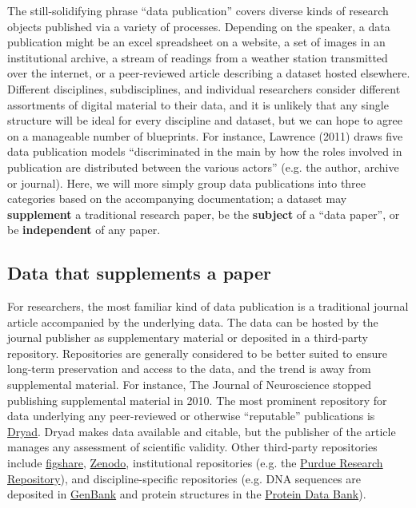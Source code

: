 \documentclass[10pt,twocolumn]{article}
\begin{document}
The still-solidifying phrase ``data publication'' covers diverse kinds of research objects published via a variety of processes.
Depending on the speaker, a data publication might be an excel spreadsheet on a website, a set of images in an institutional archive, a stream of readings from a weather station transmitted over the internet, or a peer-reviewed article describing a dataset hosted elsewhere.
Different disciplines, subdisciplines, and individual researchers consider different assortments of digital material to their data, and it is unlikely that any single structure will be ideal for every discipline and dataset, but we can hope to agree on a manageable number of blueprints.
For instance, Lawrence (2011) draws five data publication models ``discriminated in the main by how the roles involved in publication are distributed between the various actors'' (e.g. the author, archive or journal).\cite{lawrence_data_2011}
Here, we will more simply group data publications into three categories based on the accompanying documentation; a dataset may \textbf{supplement} a traditional research paper, be the \textbf{subject} of a ``data paper'', or be \textbf{independent} of any paper.

\subsection*{Data that supplements a paper}\label{paper-supplement-data}

For researchers, the most familiar kind of data publication is a traditional journal article accompanied by the underlying data.
The data can be hosted by the journal publisher as supplementary material or deposited in a third-party repository.
Repositories are generally considered to be better suited to ensure long-term preservation and access to the data, and the trend is away from supplemental material. 
For instance, The Journal of Neuroscience stopped publishing supplemental material in 2010.\cite{maunsell_announcement_2010}
The most prominent repository for data underlying any peer-reviewed or otherwise ``reputable'' publications is \href{http://www.datadryad.org/}{Dryad}. 
Dryad makes data available and citable, but the publisher of the article manages any assessment of scientific validity.
Other third-party repositories include \href{http://figshare.com/}{figshare}, \href{http://zenodo.org/}{Zenodo}, institutional repositories (e.g. the \href{https://purr.purdue.edu/}{Purdue Research Repository}), and discipline-specific repositories (e.g. DNA sequences are deposited in \href{http://www.ncbi.nlm.nih.gov/genbank/}{GenBank}\cite{benson_genbank_2013} and protein structures in the \href{http://www.rcsb.org/}{Protein Data Bank}\cite{berman_protein_2000}).
\end{document}
